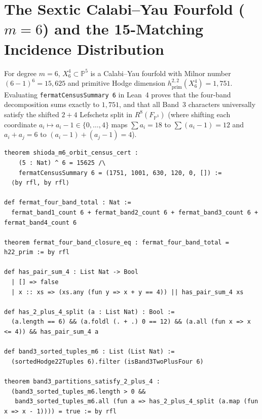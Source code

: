 \documentclass[11pt,a4paper]{article}
\begin{document}
\section{The Sextic Calabi--Yau Fourfold (\texorpdfstring{$m = 6$}{m = 6}) and the 15-Matching Incidence Distribution}

For degree $m = 6$, $X_6^4 \subset \mathbb{P}^5$ is a Calabi--Yau fourfold with Milnor number $(6-1)^6 = 15{,}625$ and primitive Hodge dimension $h^{2,2}_{\mathrm{prim}}(X_6^4) = 1{,}751$. Evaluating \texttt{fermatCensusSummary 6} in Lean~4 proves that the four-band decomposition sums exactly to $1{,}751$, and that all Band~3 characters universally satisfy the shifted $2+4$ Lefschetz split in $R^8(F_{\mathbb{P}^3})$ (where shifting each coordinate $a_i \mapsto a_i - 1 \in \{0, \dots, 4\}$ maps $\sum a_i = 18$ to $\sum (a_i - 1) = 12$ and $a_i + a_j = 6$ to $(a_i - 1) + (a_j - 1) = 4$).

\begin{lstlisting}[caption={Sextic Calabi--Yau fourfold census and Band~3 universal split.}]
theorem shioda_m6_orbit_census_cert :
    (5 : Nat) ^ 6 = 15625 /\
    fermatCensusSummary 6 = (1751, 1001, 630, 120, 0, []) :=
  ⟨by rfl, by rfl⟩

def fermat_four_band_total : Nat :=
  fermat_band1_count 6 + fermat_band2_count 6 + fermat_band3_count 6 + fermat_band4_count 6

theorem fermat_four_band_closure_eq : fermat_four_band_total = h22_prim := by rfl

def has_pair_sum_4 : List Nat -> Bool
  | [] => false
  | x :: xs => (xs.any (fun y => x + y == 4)) || has_pair_sum_4 xs

def has_2_plus_4_split (a : List Nat) : Bool :=
  (a.length == 6) && (a.foldl (. + .) 0 == 12) && (a.all (fun x => x <= 4)) && has_pair_sum_4 a

def band3_sorted_tuples_m6 : List (List Nat) :=
  (sortedHodge22Tuples 6).filter (isBand3TwoPlusFour 6)

theorem band3_partitions_satisfy_2_plus_4 :
  (band3_sorted_tuples_m6.length > 0 &&
   band3_sorted_tuples_m6.all (fun a => has_2_plus_4_split (a.map (fun x => x - 1)))) = true := by rfl
\end{lstlisting}
\end{document}
